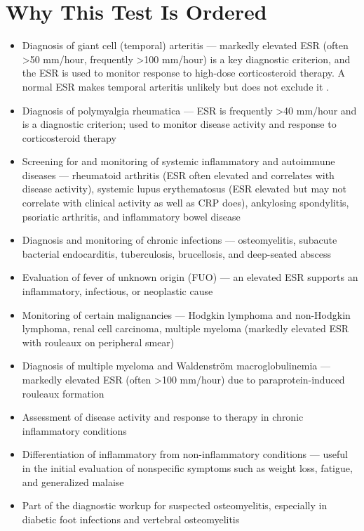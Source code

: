 \section*{Why This Test Is Ordered}
\begin{itemize}
  \item Diagnosis of giant cell (temporal) arteritis --- markedly elevated ESR (often >50 mm/hour, frequently >100 mm/hour) is a key diagnostic criterion, and the ESR is used to monitor response to high-dose corticosteroid therapy. A normal ESR makes temporal arteritis unlikely but does not exclude it \cite{salvarani2008polymyalgia}.
  \item Diagnosis of polymyalgia rheumatica --- ESR is frequently >40 mm/hour and is a diagnostic criterion; used to monitor disease activity and response to corticosteroid therapy \cite{kermani2013polymyalgia}
  \item Screening for and monitoring of systemic inflammatory and autoimmune diseases --- rheumatoid arthritis (ESR often elevated and correlates with disease activity), systemic lupus erythematosus (ESR elevated but may not correlate with clinical activity as well as CRP does), ankylosing spondylitis, psoriatic arthritis, and inflammatory bowel disease
  \item Diagnosis and monitoring of chronic infections --- osteomyelitis, subacute bacterial endocarditis, tuberculosis, brucellosis, and deep-seated abscess
  \item Evaluation of fever of unknown origin (FUO) --- an elevated ESR supports an inflammatory, infectious, or neoplastic cause
  \item Monitoring of certain malignancies --- Hodgkin lymphoma and non-Hodgkin lymphoma, renal cell carcinoma, multiple myeloma (markedly elevated ESR with rouleaux on peripheral smear)
  \item Diagnosis of multiple myeloma and Waldenstr\"{o}m macroglobulinemia --- markedly elevated ESR (often >100 mm/hour) due to paraprotein-induced rouleaux formation
  \item Assessment of disease activity and response to therapy in chronic inflammatory conditions
  \item Differentiation of inflammatory from non-inflammatory conditions --- useful in the initial evaluation of nonspecific symptoms such as weight loss, fatigue, and generalized malaise
  \item Part of the diagnostic workup for suspected osteomyelitis, especially in diabetic foot infections and vertebral osteomyelitis
\end{itemize}

